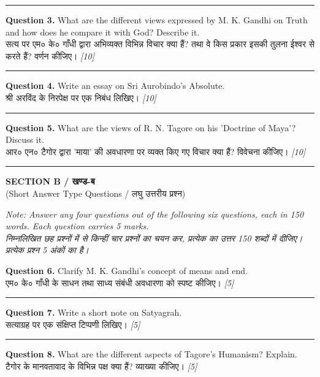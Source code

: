 \documentclass[11pt,a4paper]{article}
\newcommand{\pts}[1]{\hfill \textit{[#1]}}
\begin{document}
\medskip\rule{\linewidth}{0.2pt}\medskip

\noindent \textbf{Question 3.} What are the different views expressed by M. K. Gandhi on Truth and how does he compare it with God? Describe it.\\[1pt]
सत्य पर एम० के० गाँधी द्वारा अभिव्यक्त विभिन्न विचार क्या हैं? तथा वे किस प्रकार इसकी तुलना ईश्वर से करते हैं? वर्णन कीजिए। \pts{10}

\medskip\rule{\linewidth}{0.2pt}\medskip

\noindent \textbf{Question 4.} Write an essay on Sri Aurobindo's Absolute.\\[1pt]
श्री अरविंद के निरपेक्ष पर एक निबंध लिखिए। \pts{10}

\medskip\rule{\linewidth}{0.2pt}\medskip

\noindent \textbf{Question 5.} What are the views of R. N. Tagore on his 'Doctrine of Maya'? Discuss it.\\[1pt]
आर० एन० टैगोर द्वारा 'माया' की अवधारणा पर व्यक्त किए गए विचार क्या हैं? विवेचना कीजिए। \pts{10}

\bigskip
\rule{\linewidth}{0.2pt}
\bigskip

\begin{center}
  {\large\bfseries SECTION B / खण्ड-ब}\\[2pt]
  {\normalsize (Short Answer Type Questions / लघु उत्तरीय प्रश्न)}
\end{center}

\noindent \textit{Note: Answer any four questions out of the following six questions, each in 150 words. Each question carries 5 marks.}\\[2pt]
\noindent \textit{निम्नलिखित छह प्रश्नों में से किन्हीं चार प्रश्नों का चयन कर, प्रत्येक का उत्तर 150 शब्दों में दीजिए। प्रत्येक प्रश्न 5 अंकों का है।}

\bigskip

\noindent \textbf{Question 6.} Clarify M. K. Gandhi's concept of means and end.\\[1pt]
एम० के० गाँधी के साधन तथा साध्य संबंधी अवधारणा को स्पष्ट कीजिए। \pts{5}

\medskip\rule{\linewidth}{0.2pt}\medskip

\noindent \textbf{Question 7.} Write a short note on Satyagrah.\\[1pt]
सत्याग्रह पर एक संक्षिप्त टिप्पणी लिखिए। \pts{5}

\medskip\rule{\linewidth}{0.2pt}\medskip

\noindent \textbf{Question 8.} What are the different aspects of Tagore's Humanism? Explain.\\[1pt]
टैगोर के मानवतावाद के विभिन्न पक्ष क्या हैं? व्याख्या कीजिए। \pts{5}
\end{document}
